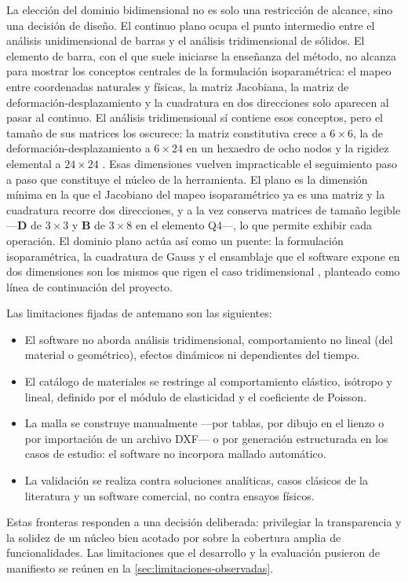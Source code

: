 La elección del dominio bidimensional no es solo una restricción de alcance, sino una decisión de diseño. El continuo plano ocupa el punto intermedio entre el análisis unidimensional de barras y el análisis tridimensional de sólidos. El elemento de barra, con el que suele iniciarse la enseñanza del método, no alcanza para mostrar los conceptos centrales de la formulación isoparamétrica: el mapeo entre coordenadas naturales y físicas, la matriz Jacobiana, la matriz de deformación-desplazamiento y la cuadratura en dos direcciones solo aparecen al pasar al continuo. El análisis tridimensional sí contiene esos conceptos, pero el tamaño de sus matrices los oscurece: la matriz constitutiva crece a $6\times6$, la de deformación-desplazamiento a $6\times24$ en un hexaedro de ocho nodos y la rigidez elemental a $24\times24$ \autocite[p.~218]{cook2002concepts}. Esas dimensiones vuelven impracticable el seguimiento paso a paso que constituye el núcleo de la herramienta. El plano es la dimensión mínima en la que el Jacobiano del mapeo isoparamétrico ya es una matriz y la cuadratura recorre dos direcciones, y a la vez conserva matrices de tamaño legible —$\bm{D}$ de $3\times3$ y $\bm{B}$ de $3\times8$ en el elemento Q4—, lo que permite exhibir cada operación. El dominio plano actúa así como un puente: la formulación isoparamétrica, la cuadratura de Gauss y el ensamblaje que el software expone en dos dimensiones son los mismos que rigen el caso tridimensional \autocite{bathe2014fem,zienkiewicz2013fem}, planteado como línea de continuación del proyecto.

Las limitaciones fijadas de antemano son las siguientes:
\begin{itemize}
    \item El software no aborda análisis tridimensional, comportamiento no lineal (del material o geométrico), efectos dinámicos ni dependientes del tiempo.
    \item El catálogo de materiales se restringe al comportamiento elástico, isótropo y lineal, definido por el módulo de elasticidad y el coeficiente de Poisson.
    \item La malla se construye manualmente —por tablas, por dibujo en el lienzo o por importación de un archivo DXF— o por generación estructurada en los casos de estudio: el software no incorpora mallado automático.
    \item La validación se realiza contra soluciones analíticas, casos clásicos de la literatura y un software comercial, no contra ensayos físicos.
\end{itemize}
Estas fronteras responden a una decisión deliberada: privilegiar la transparencia y la solidez de un núcleo bien acotado por sobre la cobertura amplia de funcionalidades. Las limitaciones que el desarrollo y la evaluación pusieron de manifiesto se reúnen en la \autoref{sec:limitaciones-observadas}.

